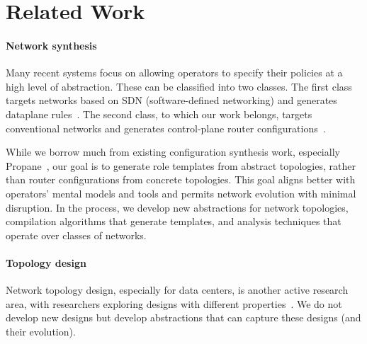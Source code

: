 \documentclass[numbers, 10pt]{sigplanconf}
\newcommand{\sysname}{{\text{}\small \sf Propane/AT}\xspace}
\newcommand{\Propane}{{\text{}\small \sf Propane}\xspace}
\newcommand{\para}[1]{\paragraph*{\textbf{#1}}}
\begin{document}
%
%
%
%

\section{Related Work}
\label{sec:related}


\para{Network synthesis} Many recent systems focus on allowing operators to specify their policies at a high level of abstraction. These can be classified into two classes. The first class targets networks based on SDN (software-defined networking) and generates dataplane rules~\cite{foster:merlin,fattire,netgen}. The second class, to which our work belongs, targets conventional networks and generates control-plane router configurations~\cite{synet-synthesis,narain+:configassure,propane}.

While we borrow much from existing configuration synthesis work, especially \Propane~\cite{propane}, our goal is to generate role templates from abstract topologies, rather than router configurations from concrete topologies.
This goal aligns better with operators' mental models and tools and permits network evolution with minimal disruption. In the process, we develop new abstractions for network topologies, compilation algorithms that generate templates, and analysis techniques that operate over classes of networks.

\para{Topology design} Network topology design, especially for data centers, is another active research area, with researchers exploring designs with different properties~\cite{fattree,facebook-fattree,f10-fattree,vl2-fattree,bcube,dcell,hyperx,butterfly}. We do not develop new designs but develop abstractions that can capture these designs (and their evolution).

\end{document}
